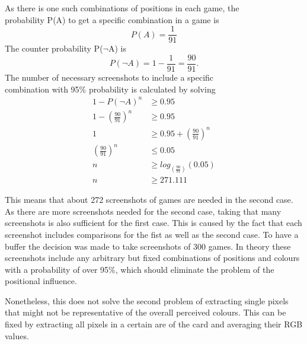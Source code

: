\begin{center}
	As there is one such combinations of positions in each game, the\\ probability P(A) to get a specific combination in a game is 
	\begin{equation*}
	P(A) = \frac{1}{91} %
	\end{equation*}
	The counter probability P($\lnot$A) is 
	\begin{equation*}
	P(\lnot A) = 1 - \frac{1}{91} = \frac{90}{91}.%
	\end{equation*}
	\newpage
	The number of necessary screenshots to include a specific \\combination with 95\% probability is calculated by solving
	\begin{align*}
	1 - P(\lnot A)^n &\geq 0.95 \\
	1 - \left(\frac{90}{91}\right)^n &\geq 0.95 \\
	1 &\geq 0.95 + \left(\frac{90}{91}\right)^n\\
	\left(\frac{90}{91}\right)^n &\leq 0.05\\
	n &\geq log_{(\frac{90}{91})}(0.05) \\
	n &\geq 271.111 %
	\end{align*}
\end{center}
This means that about 272 screenshots of games are needed in the second case. As there are more screenshots needed for the second case, taking that many screenshots is also sufficient for the first case. This is caused by the fact that each screenshot includes comparisons for the fist as well as the second case. To have a buffer the decision was made to take screenshots of 300 games. In theory these screenshots include any arbitrary but fixed combinations of positions and colours with a probability of over 95\%, which should eliminate the problem of the positional influence.

Nonetheless, this does not solve the second problem of extracting single pixels that might not be representative of the overall perceived colours. This can be fixed by extracting all pixels in a certain are of the card and averaging their RGB values.  %

